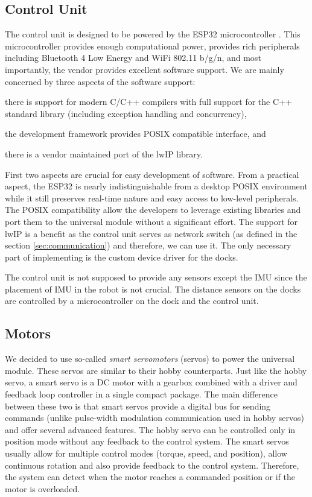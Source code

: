 \subsection{Control Unit}

The control unit is designed to be powered by the ESP32 microcontroller
\cite{noauthor_esp32_2018}. This microcontroller provides enough computational
power, provides rich peripherals including Bluetooth 4 Low Energy and WiFi
802.11 b/g/n, and most importantly, the vendor provides excellent software
support. We are mainly concerned by three aspects of the software support:
\begin{enumerate*}
    \item there is support for modern C/C++ compilers with full support for the
    C++ standard library (including exception handling and concurrency),
    \item the development framework provides POSIX compatible interface, and
    \item there is a vendor maintained port of the lwIP library.
\end{enumerate*}

First two aspects are crucial for easy development of software. From a practical
aspect, the ESP32 is nearly indistinguishable from a desktop POSIX environment
while it still preserves real-time nature and easy access to low-level
peripherals. The POSIX compatibility allow the developers to leverage existing
libraries and port them to the universal module without a significant effort.
The support for lwIP is a benefit as the control unit serves as network
switch (as defined in the section \ref{sec:communication}) and therefore, we can
use it. The only necessary part of implementing is the custom device driver for the
docks.

The control unit is not supposed to provide any sensors except the IMU since the
placement of IMU in the robot is not crucial. The distance sensors on the docks
are controlled by a microcontroller on the dock and the control unit.


\subsection{Motors}

We decided to use so-called \emph{smart servomotors} (servos) to power the
universal module. These servos are similar to their hobby counterparts. Just
like the hobby servo, a smart servo is a DC motor with a gearbox combined with a
driver and feedback loop controller in a single compact package. The main
difference between these two is that smart servos provide a digital bus for
sending commands (unlike pulse-width modulation communication used in hobby
servos) and offer several advanced features. The hobby servo can be controlled
only in position mode without any feedback to the control system. The smart
servos usually allow for multiple control modes (torque, speed, and position),
allow continuous rotation and also provide feedback to the control system.
Therefore, the system can detect when the motor reaches a commanded
position or if the motor is overloaded.

